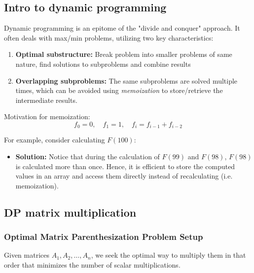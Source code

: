 \subsection{Intro to dynamic programming}
\begin{definition}
    Dynamic programming is an epitome of the "divide and conquer" approach. It often deals with max/min problems, utilizing two key characteristics:
    \begin{enumerate}
        \item \textbf{Optimal substructure:} Break problem into smaller problems of same nature, find solutions to subproblems and combine results 
        \item \textbf{Overlapping subproblems:} The same subproblems are solved multiple times, which can be avoided using \textit{memoization} to store/retrieve the intermediate results.
    \end{enumerate}
\end{definition}

\begin{example}
    Motivation for memoization:
    \begin{equation*}
        f_0 = 0, \quad f_1 = 1, \quad f_i = f_{i-1} + f_{i-2}
        \end{equation*}
        
        For example, consider calculating \(F(100)\):
        
        
        \begin{itemize}
            \item \textbf{Solution:} Notice that during the calculation of \(F(99)\) and \(F(98)\), \(F(98)\) is calculated more than once. Hence, it is efficient to store the computed values in an array and access them directly instead of recalculating (i.e. memoization).
        \end{itemize}
\end{example}

\subsection{DP matrix multiplication}
\subsubsection{Optimal Matrix Parenthesization Problem Setup}
\begin{definition}
    Given matrices \(A_1, A_2, \dots, A_n\), we seek the optimal way to multiply them in that order that minimizes the number of scalar multiplications. 
\end{definition}

